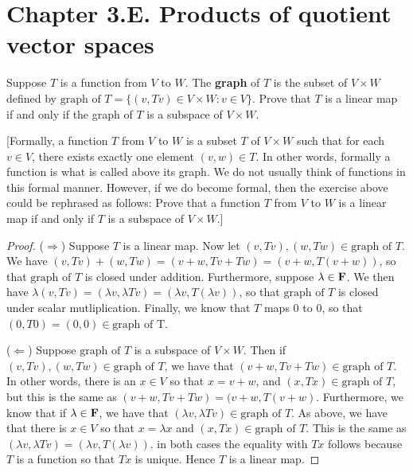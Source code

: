 \section*{Chapter 3.E. Products of quotient vector spaces}


\begin{exercise}{1}
  Suppose $T$ is a function from $V$ to $W$. The \textbf{graph} of $T$ is the subset of $V\times W$ defined by $\text{graph of }T=\{(v,Tv)\in V\times W:v\in V\}$. Prove that $T$ is a linear map if and only if the graph of $T$ is a subspace of $V\times W$. 
  
  [Formally, a function $T$ from $V$ to $W$ is a subset $T$ of $V\times W$ such that for each $v\in V$, there exists exactly one element $(v,w)\in T$. In other words, formally a function is what is called above its graph. We do not usually think of functions in this formal manner. However, if we do become formal, then the exercise above could be rephrased as follows: Prove that a function $T$ from $V$ to $W$ is a linear map if and only if $T$ is a subspace of $V\times W$.]
\end{exercise}
\begin{proof}
 ($\Rightarrow$) Suppose $T$ is a linear map. Now let $(v,Tv),(w,Tw)\in\text{graph of }T$. We have $(v,Tv)+(w,Tw)= (v+w, Tv+Tw)= (v+w, T(v+w))$, so that $\text{graph of }T$ is closed under addition. Furthermore, suppose $\lambda\in\mathbf{F}$. We then have $\lambda(v,Tv)= (\lambda v, \lambda Tv)= (\lambda v, T(\lambda v))$, so that $\text{graph of }T$ is closed under scalar mutliplication. Finally, we know that $T$ maps $0$ to $0$, so that $(0, T0)=(0,0)\in\text{graph of T}$.

 ($\Leftarrow$) Suppose $\text{graph of }T$ is a subspace of $V\times W$. Then if $(v,Tv),(w,Tw)\in\text{graph of }T$, we have that $(v+w,Tv+Tw)\in\text{graph of }T$. In other words, there is an $x\in V$ so that $x=v+w$, and $(x,Tx)\in\text{graph of }T$, but this is the same as $(v+w, Tv+Tw)=(v+w, T(v+w)$. Furthermore, we know that if $\lambda\in\mathbf{F}$, we have that $(\lambda v, \lambda Tv)\in\text{graph of }T$. As above, we have that there is $x\in V$ so that $x=\lambda x$ and $(x,Tx)\in\text{graph of }T$. This is the same as $(\lambda v, \lambda Tv)=(\lambda v, T(\lambda v))$. in both cases the equality with $Tx$ follows because $T$ is a function so that $Tx$ is unique. Hence $T$ is a linear map.
\end{proof}

